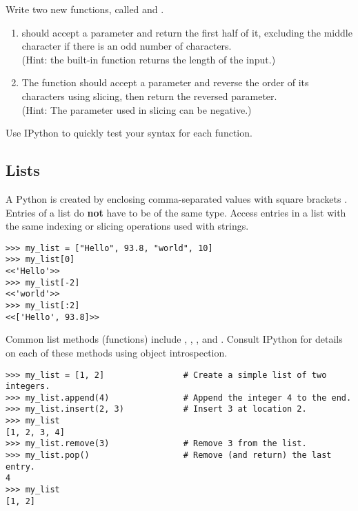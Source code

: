 \begin{problem} %
Write two new functions, called  and .
\begin{enumerate}
\item {} should accept a parameter and return the first half of it, excluding the middle character if there is an odd number of characters.
\\
(Hint: the built-in function  returns the length of the input.)
\item The  function should accept a parameter and reverse the order of its characters using slicing, then return the reversed parameter.
\\
(Hint: The  parameter used in slicing can be negative.)
\end{enumerate}
Use IPython to quickly test your syntax for each function.
\end{problem}

\subsection*{Lists} %

A Python  is created by enclosing comma-separated values with square brackets \li{[ ]}.
Entries of a list do \textbf{not} have to be of the same type.
Access entries in a list with the same indexing or slicing operations used with strings.

\begin{lstlisting}
>>> my_list = ["Hello", 93.8, "world", 10]
>>> my_list[0]
<<'Hello'>>
>>> my_list[-2]
<<'world'>>
>>> my_list[:2]
<<['Hello', 93.8]>>
\end{lstlisting}

Common list methods (functions) include , , , and .
Consult IPython for details on each of these methods using object introspection.
\begin{lstlisting}
>>> my_list = [1, 2]                # Create a simple list of two integers.
>>> my_list.append(4)               # Append the integer 4 to the end.
>>> my_list.insert(2, 3)            # Insert 3 at location 2.
>>> my_list
[1, 2, 3, 4]
>>> my_list.remove(3)               # Remove 3 from the list.
>>> my_list.pop()                   # Remove (and return) the last entry.
4
>>> my_list
[1, 2]
\end{lstlisting}


